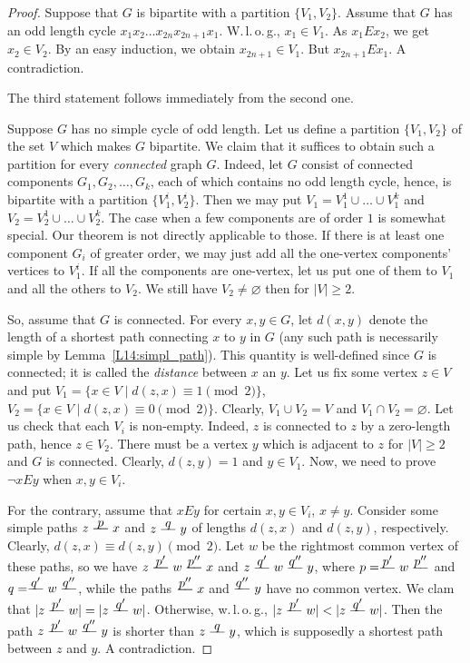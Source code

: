\documentclass[12pt,notitlepage]{article}
\theoremstyle{plain}
\theoremstyle{definition}
\theoremstyle{plain}
\newcommand{\void}{\varnothing}
\newcommand{\1}{\mathbf{1}}
\newcommand{\0}{\mathbf{0}}
\newcommand{\pth}[1]{\overset{\raisebox{0.25em}{$ #1 $}}{\relbar\hspace{-.8mm}\relbar}}
\begin{document}
\begin{proof}
	Suppose that $G$ is bipartite with a partition $\{V_1, V_2\}$. Assume that $G$ has an odd length cycle $x_1 x_2 \ldots x_{2n} x_{2n + 1} x_1$. W.\,l.\,o.\,g., $x_1 \in V_1$. As $x_1 E x_2$, we get $x_2 \in V_2$. By an easy induction, we obtain $x_{2n + 1} \in V_1$. But $x_{2n + 1} E x_1$. A contradiction.
	
	The third statement follows immediately from the second one.
	
	Suppose $G$ has no simple cycle of odd length. Let us define a partition $\{V_1, V_2\}$ of the set $V$ which makes $G$ bipartite. We claim that it suffices to obtain such a partition for every \emph{connected} graph $G$. Indeed, let $G$ consist of connected components $G_1, G_2, \ldots, G_k$, each of which contains no odd length cycle, hence, is bipartite with a partition $\{V^i_1, V^i_2\}$. Then we may put $V_1 = V^1_1 \cup \ldots \cup V^k_1$ and $V_2 = V^1_2 \cup \ldots \cup V^k_2$. The case when a few components are of order $1$ is somewhat special. Our theorem is not directly applicable to those. If there is at least one component $G_i$ of greater order, we may just add all the one-vertex components' vertices to $V^i_1$. If all the components are one-vertex, let us put one of them to $V_1$ and all the others to $V_2$. We still have $V_2  \neq \void$ then for $|V| \geq 2$.
	
	So, assume that $G$ is connected. For every $x, y \in G$, let $d(x,y)$ denote the length of a shortest path connecting $x$ to $y$ in $G$ (any such path is necessarily simple by Lemma~\ref{L14:simpl_path}). This quantity is well-defined since $G$ is connected; it is called the \emph{distance} between $x$ an $y$. Let us fix some vertex $z \in V$ and put $V_1 = \{ x \in V \mid d(z,x) \equiv 1 \pmod 2 \}$, $V_2 = \{ x \in V \mid d(z,x) \equiv 0 \pmod 2 \}$. Clearly, $V_1 \cup V_2 = V$ and $V_1 \cap V_2 = \void$. Let us check that each $V_i$ is non-empty. Indeed, $z$ is connected to $z$ by a zero-length path, hence $z \in V_2$. There must be a vertex $y$ which is adjacent to $z$ for $|V| \geq 2$ and $G$ is connected. Clearly, $d(z, y) = 1$ and $y \in V_1$. Now, we need to prove $\neg x E y$ when $x, y \in V_i$.
	
	For the contrary, assume that $x E y$ for certain $x, y \in V_i$, $x \neq y$. Consider some simple paths $z \pth{p} x$ and $z \pth{q} y$ of lengths $d(z,x)$ and $d(z,y)$, respectively. Clearly, $d(z,x) \equiv d(z,y) \pmod 2$. Let $w$ be the rightmost common vertex of these paths, so we have $z \pth{p'} w \pth{p''} x$ and $z \pth{q'} w \pth{q''} y$, where $p = \pth{p'} w \pth{p''}$ and $q = \pth{q'} w \pth{q''}$, while the paths $\pth{p''} x$ and $\pth{q''} y$ have no common vertex. We clam that $|z \pth{p'} w| = |z \pth{q'} w|$. Otherwise, w.\,l.\,o.\,g., $|z \pth{p'} w| < |z \pth{q'} w|$. Then the path $z \pth{p'} w \pth{q''} y$ is shorter than $z \pth{q} y$, which is supposedly a shortest path between $z$ and $y$. A contradiction.
	

\end{proof}
\end{document}
